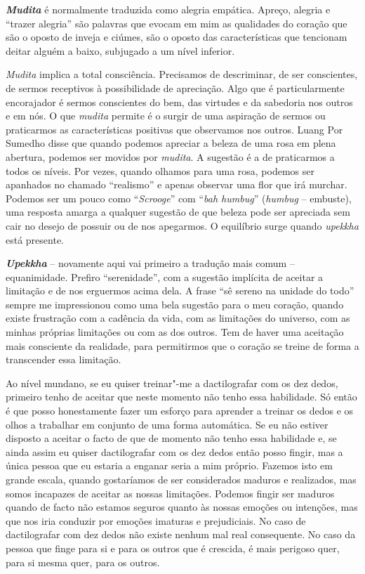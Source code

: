 \emph{\textbf{Mudita}} é normalmente traduzida como alegria empática. Apreço,
alegria e ``trazer alegria'' são palavras que evocam em mim as
qualidades do coração que são o oposto de inveja e ciúmes, são o oposto
das características que tencionam deitar alguém a baixo, subjugado a um
nível inferior.

\emph{Mudita} implica a total consciência. Precisamos de descriminar, de
ser conscientes, de sermos receptivos à possibilidade de apreciação.
Algo que é particularmente encorajador é sermos conscientes do bem, das
virtudes e da sabedoria nos outros e em nós. O que \emph{mudita} permite
é o surgir de uma aspiração de sermos ou praticarmos as características
positivas que observamos nos outros. Luang Por Sumedho disse que quando
podemos apreciar a beleza de uma rosa em plena abertura, podemos ser
movidos por \emph{mudita}. A sugestão é a de praticarmos a todos os
níveis. Por vezes, quando olhamos para uma rosa, podemos ser apanhados
no chamado ``realismo'' e apenas observar uma flor que irá murchar.
Podemos ser um pouco como ``\emph{Scrooge}'' com ``\emph{bah humbug}''
(\emph{humbug} -- embuste), uma resposta amarga a qualquer sugestão de
que beleza pode ser apreciada sem cair no desejo de possuir ou de nos
apegarmos. O equilíbrio surge quando \emph{upekkha} está presente.

\emph{\textbf{Upekkha}} -- novamente aqui vai primeiro a tradução mais comum --
equanimidade. Prefiro ``serenidade'', com a sugestão implícita de
aceitar a limitação e de nos erguermos acima dela. A frase ``sê sereno
na unidade do todo'' sempre me impressionou como uma bela sugestão para
o meu coração, quando existe frustração com a cadência da vida, com as
limitações do universo, com as minhas próprias limitações ou com as dos
outros. Tem de haver uma aceitação mais consciente da realidade, para
permitirmos que o coração se treine de forma a transcender essa
limitação.

Ao nível mundano, se eu quiser treinar"-me a dactilografar com os dez
dedos, primeiro tenho de aceitar que neste momento não tenho essa
habilidade. Só então é que posso honestamente fazer um esforço para
aprender a treinar os dedos e os olhos a trabalhar em conjunto de uma
forma automática. Se eu não estiver disposto a aceitar o facto de que de
momento não tenho essa habilidade e, se ainda assim eu quiser
dactilografar com os dez dedos então posso fingir, mas a única pessoa
que eu estaria a enganar seria a mim próprio. Fazemos isto em grande
escala, quando gostaríamos de ser considerados maduros e realizados, mas
somos incapazes de aceitar as nossas limitações. Podemos fingir ser
maduros quando de facto não estamos seguros quanto às nossas emoções ou
intenções, mas que nos iria conduzir por emoções imaturas e
prejudiciais. No caso de dactilografar com dez dedos não existe nenhum
mal real consequente. No caso da pessoa que finge para si e para os
outros que é crescida, é mais perigoso quer, para si mesma quer, para os
outros.

